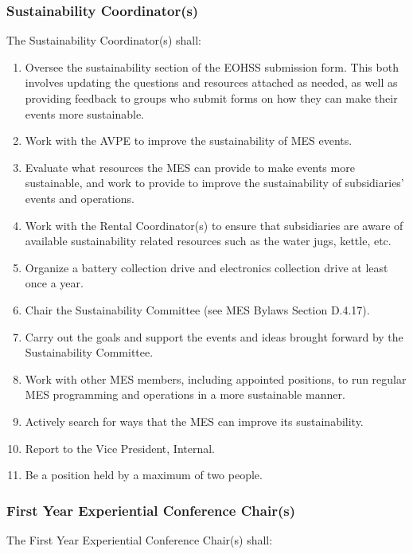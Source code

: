 \hypertarget{sustainability-coordinators}{%
 \subsubsection{Sustainability
  Coordinator(s)}
 \label{sustainability-coordinators}}
The Sustainability Coordinator(s) shall:

\begin{enumerate}
 \item
  Oversee the sustainability section of the EOHSS submission form. This
  both involves updating the questions and resources attached as needed,
  as well as providing feedback to groups who submit forms on how they
  can make their events more sustainable.
 \item
  Work with the AVPE to improve the sustainability of MES events.
 \item
  Evaluate what resources the MES can provide to make events more
  sustainable, and work to provide to improve the sustainability of
  subsidiaries' events and operations.
 \item
  Work with the Rental Coordinator(s) to ensure that subsidiaries are
  aware of available sustainability related resources such as the water
  jugs, kettle, etc.
 \item
  Organize a battery collection drive and electronics collection drive
  at least once a year.
 \item
  Chair the Sustainability Committee (see MES Bylaws Section D.4.17).
 \item
  Carry out the goals and support the events and ideas brought forward
  by the Sustainability Committee.
 \item
  Work with other MES members, including appointed positions, to run
  regular MES programming and operations in a more sustainable manner.
 \item
  Actively search for ways that the MES can improve its sustainability.
 \item
  Report to the Vice President, Internal.
 \item
  Be a position held by a maximum of two people.

\end{enumerate}

\hypertarget{first-year-experiential-conference-chairs}{%
 \subsubsection{First Year Experiential Conference
  Chair(s)}
 \label{first-year-experiential-conference-chairs}}
The First Year Experiential Conference Chair(s) shall:

